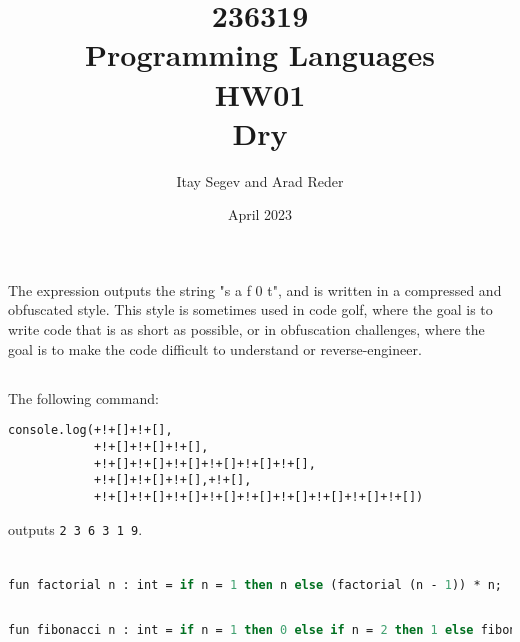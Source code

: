 \documentclass{article}
\title{%
       236319 \\
       Programming Languages \\
       \large HW01 \\
       \small Dry}
\author{Itay Segev and Arad Reder}
\date{April 2023}
\begin{document}
\maketitle

\section{}
\subsection{}
The expression outputs the string "s a f 0 t", and is written in a compressed and obfuscated style. This style is sometimes used in code
golf, where the goal is to write code that is as short as possible, or in obfuscation challenges, where the goal is to make the code difficult
to understand or reverse-engineer.
\subsection{}
The following command:
\begin{lstlisting}
console.log(+!+[]+!+[],
            +!+[]+!+[]+!+[],
            +!+[]+!+[]+!+[]+!+[]+!+[]+!+[],
            +!+[]+!+[]+!+[],+!+[],
            +!+[]+!+[]+!+[]+!+[]+!+[]+!+[]+!+[]+!+[]+!+[])
\end{lstlisting}
outputs \lstinline{2 3 6 3 1 9}.

\section{}
\subsection{}
\begin{lstlisting}[language=Pascal]
fun factorial n : int = if n = 1 then n else (factorial (n - 1)) * n;
\end{lstlisting}

\subsection{}
\begin{lstlisting}[language=Pascal]
fun fibonacci n : int = if n = 1 then 0 else if n = 2 then 1 else fibonacci(n - 1) + fibonacci(n - 2);
\end{lstlisting}

\section{}
\end{document}
